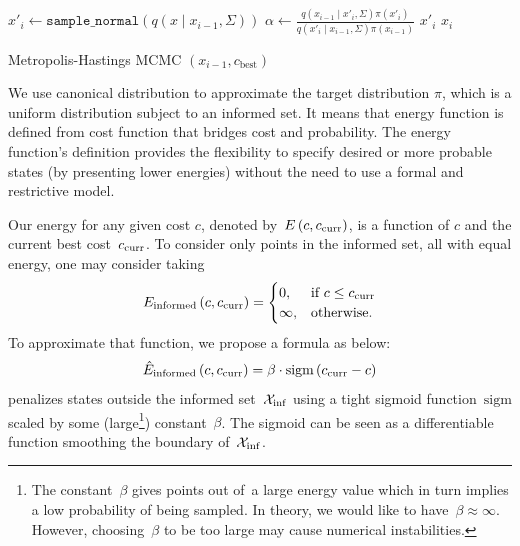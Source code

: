 \documentclass[letterpaper, 10 pt, conference]{ieeeconf}  %
\begin{document}
\begin{algorithm}[t]
	\begin{algorithmic}[1]
		\STATE $ x'_{i} \leftarrow \texttt{sample\_normal}( q ( x \mid x_{i-1},\Sigma) ) $ 
		\label{start}
		\STATE $ \alpha \leftarrow \frac{ q ( x_{i-1} \mid x'_{i},\Sigma) \pi( x'_{i} ) }{ q ( x'_{i} \mid x_{i-1},\Sigma) \pi( x_{i-1} ) } $
            \RETURN $ x'_{i} $
		\ENDIF
		\RETURN $ x_{i} $
	\end{algorithmic}
	\caption{Metropolis-Hastings MCMC $(x_{i-1}, c_{\text{best}})$}
	\label{alg:mh_mcmc}	
\end{algorithm}

We use canonical distribution to approximate the target distribution $ \pi $, which is a uniform distribution subject to an informed set.
It means that energy function is defined from cost function that bridges cost and probability.
The energy function's definition provides the flexibility to specify desired or more probable states (by presenting lower energies) without the need to use a formal and restrictive model. 

Our energy for any given cost $c$, 
denoted by~$E\left(c,c_{\rm{curr}} \right)$, 
is a function of $c$ and the current best cost~$c_{\rm{curr}}$.
To consider only points in the informed set, all with equal energy, one may consider taking 
\begin{equation}
E_{\text{informed}}\left(c,c_{\rm{curr}} \right) = 
\begin{cases}
0,	& \text{if } c \leq c_{\rm{curr}}\\        
\infty,  	& \text{otherwise}.
\end{cases}
\end{equation}
To approximate that function, we propose a formula as below:
\begin{equation}
\hat{E}_{\text{informed}} \left( c,c_{\rm{curr}} \right) 
= \beta \cdot \text{sigm}\left(c_{\rm{curr}} - c\right)
\end{equation}
penalizes states outside the informed set~$\mathcal{X}_{\rm {inf}}$ using a tight sigmoid function~$\text{sigm}$ scaled by some (large\footnote{The constant~$\beta$ gives points out of~\Cinf a large energy value which in turn implies a low probability of being sampled. 
In theory, we would like to have~$\beta \approx \infty$. 
However, choosing~$\beta$ to be too large may cause numerical instabilities.}) constant~$\beta$.
The sigmoid can be seen as a differentiable function smoothing the boundary of~$\mathcal{X}_{\rm {inf}}$.
\end{document}
